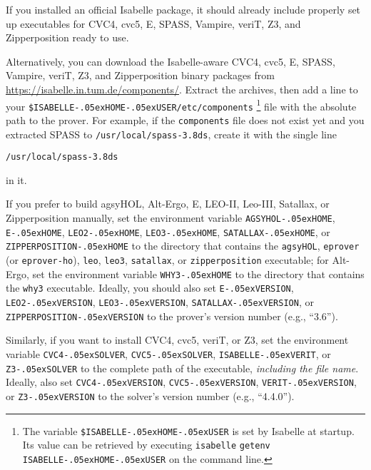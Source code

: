 \documentclass[a4paper,12pt]{article}
\newcommand\download{\url{https://isabelle.in.tum.de/components/}}
\renewcommand\_{\hbox{\textunderscore\kern-.05ex}}
\begin{document}
\begin{sloppy}
\begin{enum}
\item[\labelitemi] If you installed an official Isabelle package, it should
already include properly set up executables for CVC4, cvc5, E, SPASS, Vampire,
veriT, Z3, and Zipperposition ready to use.

\item[\labelitemi] Alternatively, you can download the Isabelle-aware CVC4,
cvc5, E, SPASS, Vampire, veriT, Z3, and Zipperposition binary packages from
\download. Extract the archives, then add a line to your
\texttt{\$ISABELLE\_HOME\_USER\slash etc\slash components}%
\footnote{The variable \texttt{\$ISABELLE\_HOME\_USER} is set by Isabelle at
startup. Its value can be retrieved by executing \texttt{isabelle}
\texttt{getenv} \texttt{ISABELLE\_HOME\_USER} on the command line.}
file with the absolute path to the prover. For example, if the
\texttt{components} file does not exist yet and you extracted SPASS to
\texttt{/usr/local/spass-3.8ds}, create it with the single line

\prew
\texttt{/usr/local/spass-3.8ds}
\postw

in it.

\item[\labelitemi] If you prefer to build agsyHOL, Alt-Ergo, E, LEO-II,
Leo-III, Satallax, or Zipperposition manually, set the environment variable
\texttt{AGSYHOL\_HOME}, \texttt{E\_HOME}, \texttt{LEO2\_HOME},
\texttt{LEO3\_HOME}, \texttt{SATALLAX\_HOME}, or \texttt{ZIPPERPOSITION\_HOME}
to the directory that contains the \texttt{agsyHOL},
\texttt{eprover} (or \texttt{eprover-ho}),
\texttt{leo}, \texttt{leo3}, \texttt{satallax}, or \texttt{zipperposition}
executable; for Alt-Ergo, set the environment variable \texttt{WHY3\_HOME} to the
directory that contains the \texttt{why3} executable. Ideally, you
should also set \texttt{E\_VERSION}, \texttt{LEO2\_VERSION},
\texttt{LEO3\_VERSION}, \texttt{SATALLAX\_VERSION}, or
\texttt{ZIPPERPOSITION\_VERSION} to the prover's version number (e.g., ``3.6'').

Similarly, if you want to install CVC4, cvc5, veriT, or Z3, set the environment
variable \texttt{CVC4\_\allowbreak SOLVER}, \texttt{CVC5\_\allowbreak SOLVER},
\texttt{ISABELLE\_\allowbreak VERIT},
or \texttt{Z3\_SOLVER} to the complete path of the executable, \emph{including
the file name}. Ideally, also set \texttt{CVC4\_VERSION}, \texttt{CVC5\_VERSION},
\texttt{VERIT\_VERSION}, or \texttt{Z3\_VERSION} to the solver's version number
(e.g., ``4.4.0'').
\end{enum}
\end{sloppy}
\end{document}
